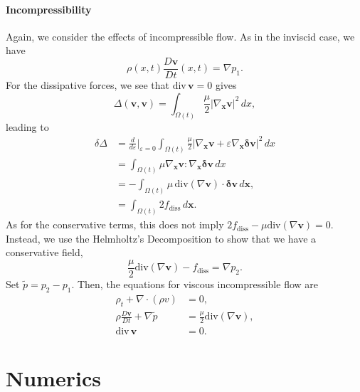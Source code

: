 \documentclass[final,10pt]{article}
\begin{document}
\paragraph{Incompressibility}
Again, we consider the effects of incompressible flow.
As in the inviscid case, we have
\[
	{\rho}({x},t) \frac{D\bm v}{D t}({x},t)	= \nabla p_1.
\]
For the dissipative forces, we see that $\mathrm{div} \, \bm v = 0$ gives
\[
	\Delta(\bm v, \bm v)	=	\int_{\Omega(t)} \frac{\mu}{2} | \nabla_{\bm x} \bm v|^2\, dx,
\]
leading to
\begin{align*}
	\delta \Delta	&=	\frac{d}{d\varepsilon}\bigg|_{\varepsilon=0} 
					\int_{\Omega(t)} \frac{\mu}{2} | \nabla_{\bm x} \bm v + \varepsilon\nabla_{\bm x} \bm\delta\bm v|^2 \, dx\\
				&=	\int_{\Omega(t)} \mu \nabla_{\bm x} \bm v:\nabla_{\bm x} \bm\delta\bm v \, dx\\
				&=	-\int_{\Omega(t)} \mu\, \mathrm{div}(\nabla \bm v)\cdot \bm\delta\bm v\, d\bm x,\\
				&=	\int_{\Omega(t)} 2 f_\mathrm{diss} \, d\bm x.
\end{align*}
As for the conservative terms, this does not imply $2f_\mathrm{diss}-\mu \mathrm{div}(\nabla \bm v)=0$.
Instead, we use the Helmholtz's Decomposition to show that we have a conservative field,
\[
	\frac{\mu}{2}\mathrm{div}(\nabla \bm v) - f_\mathrm{diss}	= \nabla p_2.
\]
Set $\tilde{{p}} = p_2-p_1$.
Then, the equations for viscous incompressible flow are
\begin{align}
			\rho_t + \nabla \cdot(\rho v)		&= 0,	\tag{Conservation of Mass}\\
	{\rho} \frac{D\bm v}{D t} + \nabla {\tilde{p}}	&= \frac{\mu}{2} \mathrm{div}(\nabla \bm v),	\tag{Force Balance}\\
						\mathrm{div}\, \bm v	&= 0.	\tag{Incompressibility}
\end{align}
























\section{Numerics}
\end{document}
